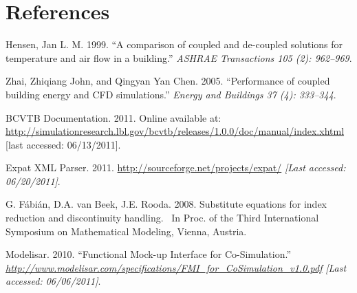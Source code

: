 \chapter{References}\label{references}

Hensen, Jan L. M. 1999. ``A comparison of coupled and de-coupled solutions for temperature and air flow in a building.'' \emph{ASHRAE Transactions 105 (2): 962--969}.

Zhai, Zhiqiang John, and Qingyan Yan Chen. 2005. ``Performance of coupled building energy and CFD simulations.'' \emph{Energy and Buildings 37 (4): 333--344}.

BCVTB Documentation. 2011. Online available at: \url{http://simulationresearch.lbl.gov/bcvtb/releases/1.0.0/doc/manual/index.xhtml} {[}last accessed: 06/13/2011{]}.

Expat XML Parser. 2011. \url{http://sourceforge.net/projects/expat/} \emph{{[}Last accessed: 06/20/2011{]}}.

G. Fábián, D.A. van Beek, J.E. Rooda. 2008. Substitute equations for index reduction and discontinuity handling.~ In Proc. of the Third International Symposium on Mathematical Modeling, Vienna, Austria.

Modelisar. 2010. ``Functional Mock-up Interface for Co-Simulation.'' \href{http://www.modelisar.com/specifications/FMI_for_CoSimulation_v1.0.pdf}{\emph{http://www.modelisar.com/specifications/FMI\_for\_CoSimulation\_v1.0.pdf}} \emph{{[}Last accessed: 06/06/2011{]}}.
